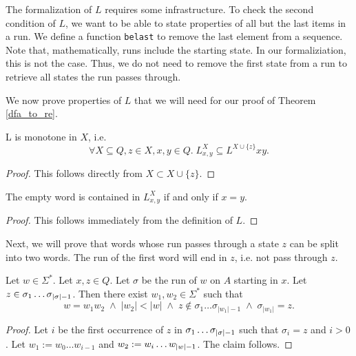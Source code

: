 The formalization of $L$ requires some infrastructure. 
To check the second condition of $L$, we want to be able to state properties of all but the last items in a run.
We define a function \lstinline{belast} to remove the last element from a sequence. 
Note that, mathematically, runs include the starting state.
In our formaliziation, this is not the case.
Thus, we do not need to remove the first state from a run to retrieve all states the run passes through.


We now prove properties of $L$ that we will need for our proof of Theorem \ref{dfa_to_re}.

\begin{lemma}
    \label{L_monotone}
    L is monotone in $X$, i.e.
    \begin{equation*}
        \forall X \subseteq Q, z \in X, x,y \in Q. \; L^X_{x,y} \subseteq L^{X\cup\{z\}} x y.
    \end{equation*}
\end{lemma}
\begin{proof}
    This follows directly from $X \subset X\cup\{z\}$.
\end{proof}


\begin{lemma}
    \label{L_nil}
    The empty word is contained in $L^X_{x,y}$ if and only if $x=y$.
\end{lemma}
\begin{proof}
   This follows immediately from the definition of $L$. 
\end{proof}


Next, we will prove that words whose run passes through a state $z$ can be split into two words. 
The run of the first word will end in $z$, i.e. not pass through $z$.

\begin{lemma}
    \label{run_split}
    Let $w \in \Sigma^*$. Let $x,z \in Q$. 
    Let $\sigma$ be the run of $w$ on $A$ starting in $x$.
    Let $z \in \sigma_1 \ldots {\sigma}_{|{\sigma}|-1}$.
    Then there exist $w_1, w_2 \in \Sigma^*$ such that
    \begin{equation*}
        w = w_1 w_2 \; \wedge \; |w_2| < |w| \; \wedge \; z \notin \sigma_1 \ldots \sigma_{|w_1|-1} \; \wedge \; \sigma_{|w_1|} = z.
    \end{equation*}
\end{lemma}
\begin{proof}
    Let $i$ be the first occurrence of $z$ in $\sigma_1 \dots {\sigma}_{|{\sigma}|-1}$ such that
    $\sigma_i = z$ and $i > 0$.
    Let $w_1 := w_0 \ldots w_{i-1}$ and $w_2 := w_i \ldots {w}_{|{w}|-1}$.
    The claim follows.
\end{proof}

